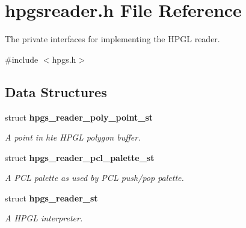 \section{hpgsreader.h File Reference}
\label{hpgsreader_8h}


The private interfaces for implementing the HPGL reader.  


{\ttfamily \#include $<$hpgs.h$>$}\par
\subsection*{Data Structures}
\begin{DoxyCompactItemize}
\item 
struct {\bf hpgs\_\-reader\_\-poly\_\-point\_\-st}
\begin{DoxyCompactList}\small\item\em A point in hte HPGL polygon buffer. \item\end{DoxyCompactList}\item 
struct {\bf hpgs\_\-reader\_\-pcl\_\-palette\_\-st}
\begin{DoxyCompactList}\small\item\em A PCL palette as used by PCL push/pop palette. \item\end{DoxyCompactList}\item 
struct {\bf hpgs\_\-reader\_\-st}
\begin{DoxyCompactList}\small\item\em A HPGL interpreter. \item\end{DoxyCompactList}\end{DoxyCompactItemize}
